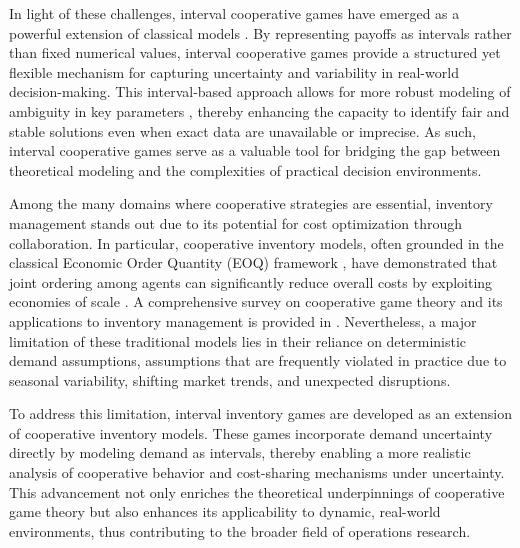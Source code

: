 \documentclass[12pt]{article}
\begin{document}
\noindent In light of these challenges, interval cooperative games have emerged as a powerful extension of classical models \cite{Branzei2010Survey}. By representing payoffs as intervals rather than fixed numerical values, interval cooperative games provide a structured yet flexible mechanism for capturing uncertainty and variability in real-world decision-making. This interval-based approach allows for more robust modeling of ambiguity in key parameters \cite{Moore2003}, thereby enhancing the capacity to identify fair and stable solutions even when exact data are unavailable or imprecise. As such, interval cooperative games serve as a valuable tool for bridging the gap between theoretical modeling and the complexities of practical decision environments.

\noindent Among the many domains where cooperative strategies are essential, inventory management stands out due to its potential for cost optimization through collaboration. In particular, cooperative inventory models, often grounded in the classical Economic Order Quantity (EOQ) framework \cite{Hillier2015}, have demonstrated that joint ordering among agents can significantly reduce overall costs by exploiting economies of scale \cite{Meca2003,Meca2004}. A comprehensive survey on cooperative game theory and its applications to inventory management is provided in \cite{Fiestras2011}. Nevertheless, a major limitation of these traditional models lies in their reliance on deterministic demand assumptions, assumptions that are frequently violated in practice due to seasonal variability, shifting market trends, and unexpected disruptions.

\noindent To address this limitation, interval inventory games are developed as an extension of cooperative inventory models. These games incorporate demand uncertainty directly by modeling demand as intervals, thereby enabling a more realistic analysis of cooperative behavior and cost-sharing mechanisms under uncertainty. This advancement not only enriches the theoretical underpinnings of cooperative game theory but also enhances its applicability to dynamic, real-world environments, thus contributing to the broader field of operations research.
\end{document}
